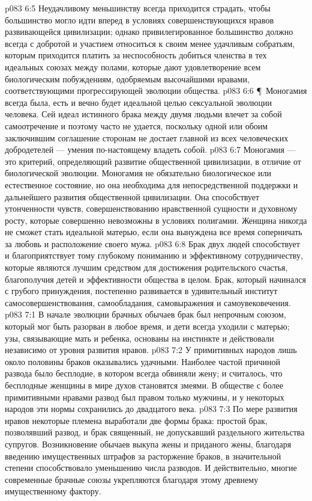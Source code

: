 \vs p083 6:5 Неудачливому меньшинству всегда приходится страдать, чтобы большинство могло идти вперед в условиях совершенствующихся нравов развивающейся цивилизации; однако привилегированное большинство должно всегда с добротой и участием относиться к своим менее удачливым собратьям, которым приходится платить за неспособность добиться членства в тех идеальных союзах между полами, которые дают удовлетворение всем биологическим побуждениям, одобряемым высочайшими нравами, соответствующими прогрессирующей эволюции общества.
\vs p083 6:6 \P\ Моногамия всегда была, есть и вечно будет идеальной целью сексуальной эволюции человека. Сей идеал истинного брака между двумя людьми влечет за собой самоотречение и поэтому часто не удается, поскольку одной или обоим заключившим соглашение сторонам не достает главной из всех человеческих добродетелей --- умения по\hyp{}настоящему владеть собой.
\vs p083 6:7 Моногамия --- это критерий, определяющий развитие общественной цивилизации, в отличие от биологической эволюции. Моногамия не обязательно биологическое или естественное состояние, но она необходима для непосредственной поддержки и дальнейшего развития общественной цивилизации. Она способствует утонченности чувств, совершенствованию нравственной сущности и духовному росту, которые совершенно невозможны в условиях полигамии. Женщина никогда не сможет стать идеальной матерью, если она вынуждена все время соперничать за любовь и расположение своего мужа.
\vs p083 6:8 Брак двух людей способствует и благоприятствует тому глубокому пониманию и эффективному сотрудничеству, которые являются лучшим средством для достижения родительского счастья, благополучия детей и эффективности общества в целом. Брак, который начинался с грубого принуждения, постепенно развивается в удивительный институт самосовершенствования, самообладания, самовыражения и самоувековечения.
\vs p083 7:1 В начале эволюции брачных обычаев брак был непрочным союзом, который мог быть разорван в любое время, и дети всегда уходили с матерью; узы, связывающие мать и ребенка, основаны на инстинкте и действовали независимо от уровня развития нравов.
\vs p083 7:2 У примитивных народов лишь около половины браков оказывались удачными. Наиболее частой причиной развода было бесплодие, в котором всегда обвиняли жену; и считалось, что бесплодные женщины в мире духов становятся змеями. В обществе с более примитивными нравами развод был правом только мужчины, и у некоторых народов эти нормы сохранились до двадцатого века.
\vs p083 7:3 По мере развития нравов некоторые племена выработали две формы брака: простой брак, позволявший развод, и брак священный, не допускавший раздельного жительства супругов. Возникновение обычаев выкупа жены и приданого жены, благодаря введению имущественных штрафов за расторжение браков, в значительной степени способствовало уменьшению числа разводов. И действительно, многие современные брачные союзы укрепляются благодаря этому древнему имущественному фактору.
